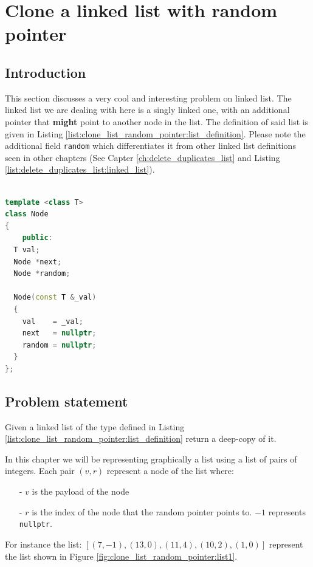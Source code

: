 %

\chapter{Clone a linked list with random pointer}
\label{ch:clone_list_random_pointer}
\section*{Introduction}
This section discusses a very cool and interesting problem on linked list. The linked list we are dealing with here is a singly linked one, with an additional pointer that \textbf{might} point to another node in the list. The \CC definition of said list is given in Listing \ref{list:clone_list_random_pointer:list_definition}. Please note the additional field \lstinline[columns=fixed]{random} which differentiates it from other linked list definitions seen in other chapters (See Capter \ref{ch:delete_duplicates_list} and Listing \ref{list:delete_duplicates_list:linked_list}).

\begin{lstlisting}[language=c++, caption={Definition of a linked list with a random pointer.},label=list:delete_duplicates_list:linked_list]

template <class T> 
class Node
{
    public:
  T val;
  Node *next;
  Node *random;

  Node(const T &_val)
  {
    val    = _val;
    next   = nullptr;
    random = nullptr;
  }
};
\end{lstlisting}

\section{Problem statement}
\begin{exercise}
Given a linked list of the type defined in Listing \ref{list:clone_list_random_pointer:list_definition} return a deep-copy of it.
\end{exercise}

In this chapter we will be representing graphically a list using a list of pairs of integers. Each pair $(v,r)$ represent a node of the list where:
\begin{itemize}
	\item[-] $v$ is the payload of the node
	\item[-] $r$ is the index of the node that the random pointer points to. $-1$ represents \lstinline[columns=fixed]{nullptr}.
\end{itemize} 
For instance the list: $[(7,-1),(13,0),(11,4),(10,2),(1,0)]$ represent the list shown in Figure \ref{fig:clone_list_random_pointer:list1}.


